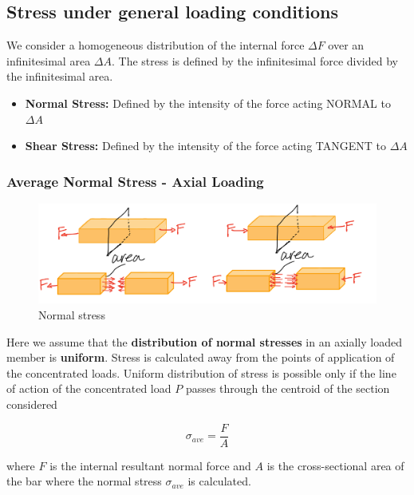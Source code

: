 \subsection {Stress under general loading conditions}

We consider a homogeneous distribution of the internal force $\Delta F$ over an infinitesimal area $\Delta A$. The stress is defined by the infinitesimal force divided by the infinitesimal area.

\begin{itemize}
    \item \textbf{Normal Stress:} Defined by the intensity of the force acting NORMAL to $\Delta A$
    \item \textbf{Shear Stress:} Defined by the intensity of the force acting TANGENT to $\Delta A$
\end{itemize} 

\subsubsection{Average Normal Stress - Axial Loading}

\begin{figure}[!h]
\centering
\includegraphics[angle=0, width=5in]{Stress-Figures/Normal Stress.png}
\vspace{-2mm}
\caption{\small Normal stress}
\vspace{-3mm}
\label{Fig:NormalStress}
\end{figure}

\noindent Here we assume that the\textbf{ distribution of normal stresses} in an axially loaded member is \textbf{uniform}. Stress is calculated away from the points of application of the concentrated loads. Uniform distribution of stress is possible only if the line of action of the concentrated load $P$ passes through the centroid of the section considered

\[\sigma_{ave} = \frac{F}{A}\]

\noindent where $F$ is the internal resultant normal force and $A$ is the cross-sectional area of the bar where the normal stress $\sigma_{ave}$ is calculated.

